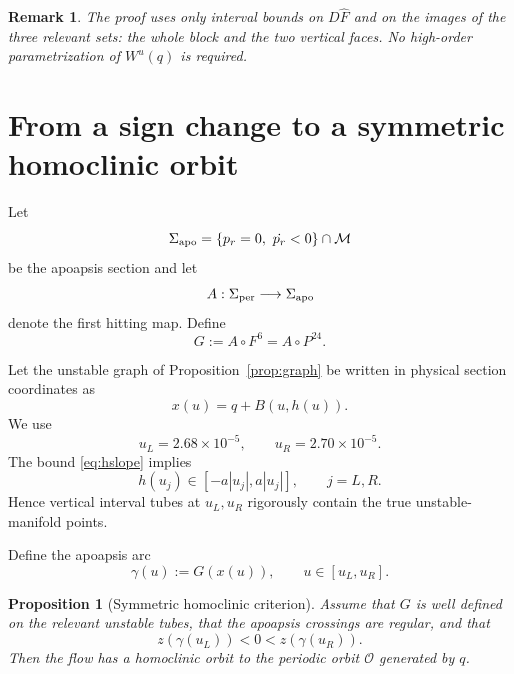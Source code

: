 \documentclass[11pt]{article}
\newtheorem{proposition}[theorem]{Proposition}
\newtheorem{remark}[theorem]{Remark}
\newcommand{\cM}{\mathcal M}
\newcommand{\cO}{\mathcal O}
\newcommand{\Wu}{W^{u}}
\newcommand{\pr}{p_r}
\begin{document}
\begin{remark}
The proof uses only interval bounds on $D\widehat F$ and on the images of
the three relevant sets: the whole block and the two vertical faces.
No high-order parametrization of $\Wu(q)$ is required.
\end{remark}

\section{From a sign change to a symmetric homoclinic orbit}
\label{sec:homoclinic}

Let
\[
 \Sigma_{\rm apo}
 =
 \{\pr=0,\ \dot{\pr}<0\}\cap\cM
\]
be the apoapsis section and let
\[
 A:\Sigma_{\rm per}\longrightarrow\Sigma_{\rm apo}
\]
denote the first hitting map.  Define
\begin{equation}\label{eq:G}
 G:=A\circ F^6=A\circ P^{24}.
\end{equation}

Let the unstable graph of Proposition~\ref{prop:graph} be written in
physical section coordinates as
\[
 x(u)=q+B(u,h(u)).
\]
We use
\begin{equation}\label{eq:uLR}
 u_L=2.68\times10^{-5},
 \qquad
 u_R=2.70\times10^{-5}.
\end{equation}
The bound \eqref{eq:hslope} implies
\[
 h(u_j)\in[-a|u_j|,a|u_j|],
 \qquad j=L,R.
\]
Hence vertical interval tubes at $u_L,u_R$ rigorously contain the true
unstable-manifold points.

Define the apoapsis arc
\begin{equation}\label{eq:gamma}
 \gamma(u):=G(x(u)),
 \qquad u\in[u_L,u_R].
\end{equation}

\begin{proposition}[Symmetric homoclinic criterion]\label{prop:homoclinic}
Assume that $G$ is well defined on the relevant unstable tubes, that the
apoapsis crossings are regular, and that
\begin{equation}\label{eq:zsign}
 z(\gamma(u_L))<0<z(\gamma(u_R)).
\end{equation}
Then the flow has a homoclinic orbit to the periodic orbit $\cO$ generated by
$q$.
\end{proposition}
\end{document}

